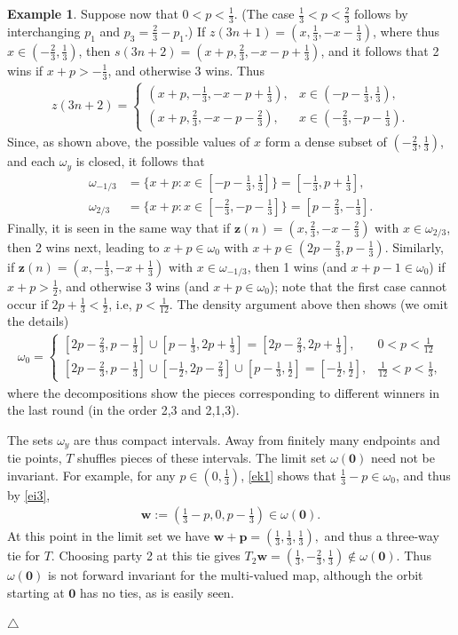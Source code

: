 \documentclass[11pt,reqno,tbtags,a4paper]{amsart}
\numberwithin{equation}{section}
\theoremstyle{plain}%
\theoremstyle{definition}
\newcommand\xqed[1]{%
    \leavevmode\unskip\penalty9999 \hbox{}\nobreak\hfill
    \quad\hbox{#1}}
\newtheorem{exampleqqq}[theorem]{Example}
\newenvironment{example}{\begin{exampleqqq}}
  {\xqed{$\triangle$}\end{exampleqqq}}
\theoremstyle{remark}
\newcounter{cases}
\newcommand\bigset[1]{\ensuremath{\bigl\{#1\bigr\}}}
\newcommand\punkt{\xperiod}    %
\newcommand\ie{i.e\punkt}
\newcounter{cc}
\newcommand\cL{{\omega}}
\newcommand\vp{\mathbf{p}}
\newcommand\vw{\mathbf{w}}
\newcommand\vz{\mathbf{z}}
\newcommand\0{{\boldsymbol 0}}
\newcommand\1{{\boldsymbol 1}}
\begin{document}
\begin{example}
Suppose now that $0<p<\frac13$. (The case $\frac13<p<\frac23$ follows by
interchanging $p_1$ and $p_3=\frac23-p_1$.)
If $z(3n+1)={(x,\frac13,-x-\frac13)}$, 
where thus $x\in(-\frac23,\frac13)$,
then
$s(3n+2)={(x+p,\frac23,-x-p+\frac13)}$, and  it follows that 
2 wins if $x+p>-\frac13$, and otherwise 3 wins. Thus
\begin{align}\label{ei5}
  z(3n+2) = 
  \begin{cases}
    (x+p,-\frac13,-x-p+\frac13), & x\in(-p-\frac13,\frac13),
\\
(x+p,\frac23,-x-p-\frac23), & x\in(-\frac23,-p-\frac13).
  \end{cases}
\end{align}
Since, as shown above, the possible values of $x$ form a dense subset of
$(-\frac23,\frac13)$, 
and each $\cL_y$ is closed,
it follows that
\begin{align}\label{ei6}
  \cL_{-1/3}&=\bigset{x+p: x\in[-p-\tfrac13,\tfrac13]}=[-\tfrac13,p+\tfrac13],
\\\label{ei7}
  \cL_{2/3}&=\bigset{x+p: x\in[-\tfrac23,-p-\tfrac13]}=[p-\tfrac23,-\tfrac13]
.\end{align}
Finally, it is seen in the same way that if 
$\vz(n)=(x,\frac23,-x-\frac23)$ with $x\in\cL_{2/3}$,
then 2 wins next, leading to $x+p\in\cL_0$ with 
$x+p\in(2p-\tfrac23,p-\tfrac13)$.
Similarly, if $\vz(n)=(x,-\frac13,-x+\frac13)$ with $x\in\cL_{-1/3}$,
then 1 wins (and $x+p-1\in\cL_0$)
if $x+p>\frac12$, and otherwise 3 wins (and $x+p\in\cL_0$);
note that the first case cannot occur if $2p+\frac13<\frac12$, \ie,
$p<\frac{1}{12}$. 
The density argument above then shows (we omit the details)
\begin{align}\label{ek1}
  \cL_0=
  \begin{cases}
    [2p-\frac23,p-\frac13]\cup[p-\frac13,2p+\frac13]
=   [2p-\frac23,2p+\frac13]
,&0<p< \frac{1}{12}
\\    [2p-\frac23,p-\frac13]\cup[-\tfrac12,2p-\frac23]\cup [p-\frac13,\frac12]
=[-\frac12,\frac12]
,& \frac{1}{12}<p<\frac13,
  \end{cases}
\end{align}
where the decompositions show the pieces corresponding to different winners
in the last round
(in the order 2,3 and 2,1,3).

The sets $\cL_y$ are thus compact intervals.
Away from finitely many endpoints and tie points, $T$ shuffles pieces of
these intervals. The  limit set $\cL(\0)$ need not be invariant.
For example, for any $p\in(0,\frac13)$,
\eqref{ek1} shows that $\frac13-p\in \cL_0$, and thus by \eqref{ei3}, 
\begin{align}\label{ekw}
 \vw:=(\tfrac13-p,0,p-\tfrac13)\in\cL(\0).
\end{align}
At this point in the limit set we have
$%
 \vw+\vp=(\tfrac13,\tfrac13,\tfrac13),
$%
and thus a three-way tie for $T$.
Choosing party 2 at this tie gives
$T_2\vw=(\tfrac13,-\tfrac23,\tfrac13)\notin\cL(\0)$.
Thus $\cL(\0)$ is not forward invariant for the multi-valued map,
although the orbit starting at $\0$ has no ties, as is easily seen.


\end{example}
\end{document}
